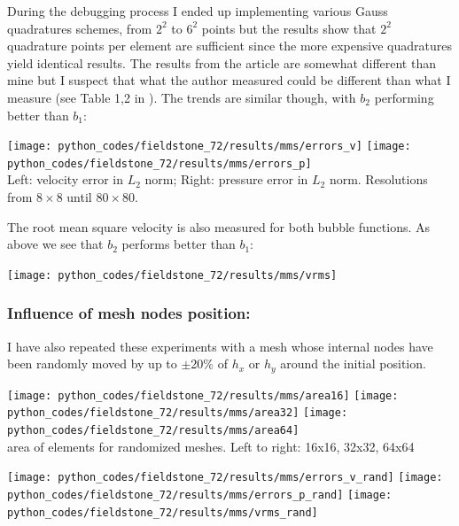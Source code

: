 During the debugging process I ended up 
implementing various Gauss quadratures schemes, from $2^2$ to $6^2$ points but the results
show that $2^2$ quadrature points per element are sufficient since the more expensive quadratures
yield identical results. 
The results from the article are somewhat different than mine but I suspect that what the 
author measured could be different than what I measure (see Table 1,2 in \cite{lami17}). 
The trends are similar though, with $b_2$ performing better than $b_1$:

\begin{center}
\texttt{[image: python\_codes/fieldstone\_72/results/mms/errors\_v]}
\texttt{[image: python\_codes/fieldstone\_72/results/mms/errors\_p]}\\
{\captionfont Left: velocity error in $L_2$ norm; Right: pressure error in $L_2$ norm.
Resolutions from $8\times8$ until $80\times80$.}
\end{center}

The root mean square velocity is also measured for both bubble functions.
As above we see that $b_2$ performs better than $b_1$:
\begin{center}
\texttt{[image: python\_codes/fieldstone\_72/results/mms/vrms]}
\end{center}


\subsubsection{Influence of mesh nodes position:} 
I have also repeated these 
experiments with a mesh whose internal nodes have been 
randomly moved by up to $\pm$20\% of $h_x$ or $h_y$ around the initial position. 

\begin{center}
\texttt{[image: python\_codes/fieldstone\_72/results/mms/area16]}
\texttt{[image: python\_codes/fieldstone\_72/results/mms/area32]}
\texttt{[image: python\_codes/fieldstone\_72/results/mms/area64]}\\
{\captionfont area of elements for randomized meshes. Left to right: 16x16, 32x32, 64x64}
\end{center}


\begin{center}
\texttt{[image: python\_codes/fieldstone\_72/results/mms/errors\_v\_rand]}
\texttt{[image: python\_codes/fieldstone\_72/results/mms/errors\_p\_rand]}
\texttt{[image: python\_codes/fieldstone\_72/results/mms/vrms\_rand]}
\end{center}

